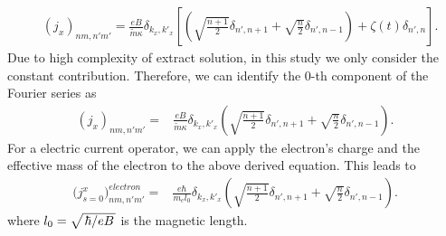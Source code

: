 \documentclass{article}
\begin{document}
\begin{itemize}
{\begin{equation}
    \begin{aligned}
      &\left({j}_x \right)_{nm,n'm'} =
      \frac{eB}{{\widetilde{m}\kappa}}
      \delta_{k_x,k'_x}
      \left[
      \left(\sqrt{\frac{n+1}{2}} \delta_{n',n+1} + \sqrt{\frac{n}{2}}
      \delta_{n',n-1}\right)
      + \zeta(t) \delta_{n',n}
      \right].
    \end{aligned}
  \end{equation}
  Due to high complexity of extract solution, in this study we only consider the constant contribution. Therefore, we can identify the $0$-th component of the Fourier series as
  \begin{equation} \tag{D11}
    \begin{aligned}
        \left({j}_x \right)_{nm,n'm'} =&
        \frac{eB}{\widetilde{m}\kappa}
        \delta_{k_x,k'_x}
        \left(\sqrt{\frac{n+1}{2}} \delta_{n',n+1} + \sqrt{\frac{n}{2}}
        \delta_{n',n-1} \right).
    \end{aligned}
  \end{equation}
  For a electric current operator, we can apply the electron's charge and the  effective mass of the electron to the above derived equation. This leads to
  \begin{equation} \tag{D12}
    \begin{aligned}
        \Big({j}^x_{s=0}\Big)_{nm,n'm'}^{electron}  =&
        \frac{e\hbar}{{m_e}l_0}
        \delta_{k_x,k'_x}
        \left(\sqrt{\frac{n+1}{2}} \delta_{n',n+1} + \sqrt{\frac{n}{2}}
        \delta_{n',n-1} \right).
    \end{aligned}
  \end{equation}
  where $l_0 = \sqrt{\flatfrac{\hbar}{eB}}$ is the magnetic length.

}
\end{itemize}
\end{document}
